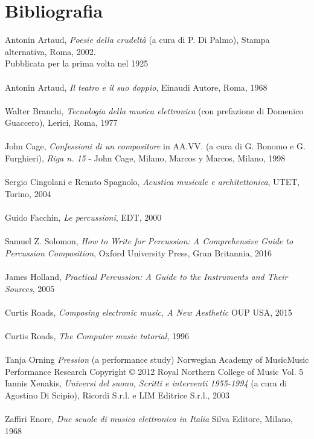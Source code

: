 
\chapter{Bibliografia}
\label{chp:Bibliografia}

Antonin Artaud, \textit{Poesie della crudeltà} (a cura di P. Di Palmo), Stampa alternativa, Roma, 2002. \\
Pubblicata per la prima volta nel 1925 \\
\\
Antonin Artaud, \textit{Il teatro e il suo doppio}, Einaudi Autore, Roma, 1968 \\
\\
Walter Branchi, \textit{Tecnologia della musica elettronica} (con prefazione di Domenico Guaccero), Lerici, Roma, 1977 \\
\\
John Cage, \textit{Confessioni di un compositore} in AA.VV. (a cura di G. Bonomo e G. Furghieri), \textit{Riga n. 15} - John Cage, Milano, Marcos y Marcos, Milano, 1998\\ 
\\
Sergio Cingolani e Renato Spagnolo, \textit{Acustica musicale e architettonica}, UTET, Torino, 2004 \\
\\
Guido Facchin,  \textit{Le percussioni}, EDT, 2000 \\
\\
Samuel Z. Solomon, \textit{How to Write for Percussion: A Comprehensive Guide to Percussion Composition},  
Oxford University Press, Gran Britannia, 2016\\
 \\
James Holland, \textit{Practical Percussion: A Guide to the Instruments and Their Sources}, 2005 \\
\\
Curtis Roads, \textit{Composing electronic music, A New Aesthetic} OUP USA, 2015 \\
\\
Curtis Roads, \textit{The Computer music tutorial}, 1996 \\
\\
Tanja Orning \textit{Pression} (a performance study) Norwegian Academy of MusicMusic Performance Research Copyright © 2012 Royal Northern College of Music Vol. 5
\\
Iannis Xenakis, \textit{Universi del suono, Scritti e interventi 1955-1994} (a cura di Agostino Di Scipio), Ricordi S.r.l. e LIM Editrice S.r.l., 2003 \\
\\
Zaffiri Enore, \textit{Due scuole di musica elettronica in Italia} Silva Editore, Milano, 1968 